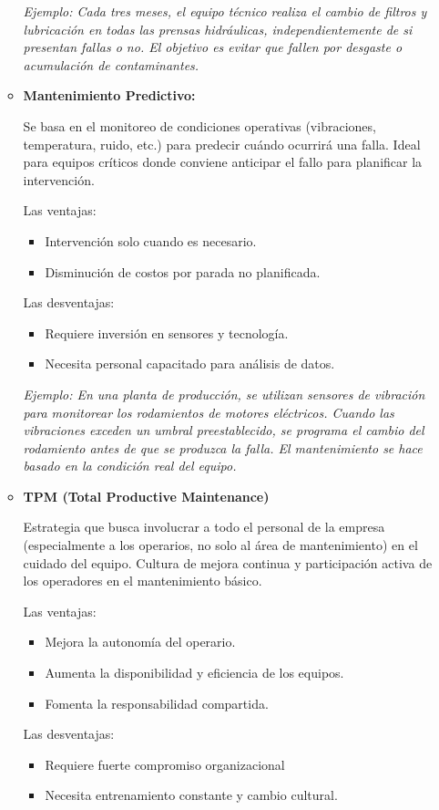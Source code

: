 \documentclass[a4paper,oneside,11pt]{article}
\begin{document}
\begin{enumerate}
\begin{itemize}
        \textit{Ejemplo: Cada tres meses, el equipo técnico realiza el cambio de filtros y lubricación en todas las prensas hidráulicas, independientemente de si presentan fallas o no. El objetivo es evitar que fallen por desgaste o acumulación de contaminantes.}

        \item \textbf{Mantenimiento Predictivo:}

        Se basa en el monitoreo de condiciones operativas (vibraciones, temperatura, ruido, etc.) para predecir cuándo ocurrirá una falla. Ideal para equipos críticos donde conviene anticipar el fallo para planificar la intervención.

        Las ventajas:
        \begin{itemize}
            \item Intervención solo cuando es necesario.
            \item Disminución de costos por parada no planificada.
        \end{itemize}
        Las desventajas:
        \begin{itemize}
            \item Requiere inversión en sensores y tecnología.
            \item Necesita personal capacitado para análisis de datos.
        \end{itemize}

        \textit{Ejemplo: En una planta de producción, se utilizan sensores de vibración para monitorear los rodamientos de motores eléctricos. Cuando las vibraciones exceden un umbral preestablecido, se programa el cambio del rodamiento antes de que se produzca la falla. El mantenimiento se hace basado en la condición real del equipo.}

        \item \textbf{TPM (Total Productive Maintenance)}

        Estrategia que busca involucrar a todo el personal de la empresa (especialmente a los operarios, no solo al área de mantenimiento) en el cuidado del equipo. Cultura de mejora continua y participación activa de los operadores en el mantenimiento básico.
        
        Las ventajas:
        \begin{itemize}
            \item Mejora la autonomía del operario.
            \item Aumenta la disponibilidad y eficiencia de los equipos.
            \item Fomenta la responsabilidad compartida.
        \end{itemize}
        Las desventajas:
        \begin{itemize}
            \item Requiere fuerte compromiso organizacional
            \item Necesita entrenamiento constante y cambio cultural.
        \end{itemize}


\end{itemize}
\end{enumerate}
\end{document}

